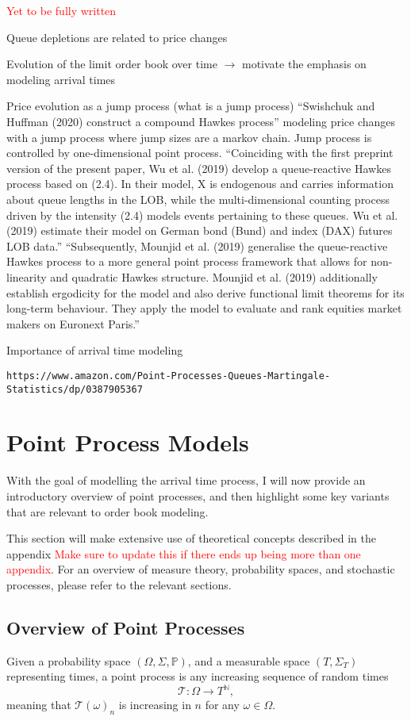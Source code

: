 \documentclass[honours,12pt]{unswthesis}
\numberwithin{equation}{section}
\begin{document}
\textcolor{red}{Yet to be fully written}

Queue depletions are related to price changes \cite{BouchaudEtAl}

Evolution of the limit order book over time $\to$ motivate the emphasis on modeling arrival times

Price evolution as a jump process (what is a jump process)
``Swishchuk and Huffman (2020) construct a compound Hawkes process'' modeling price changes with a jump process where jump sizes are a markov chain. Jump process is controlled by one-dimensional point process.
``Coinciding with the first preprint version of the present paper, Wu et al. (2019) develop a queue-reactive Hawkes process based on (2.4). In their model, X is endogenous and carries information about queue lengths in the LOB, while the multi-dimensional counting process driven by the intensity (2.4) models events pertaining to these queues. Wu et al. (2019) estimate their model on German bond (Bund) and index (DAX) futures LOB data.''
``Subsequently, Mounjid et al. (2019) generalise the queue-reactive Hawkes process to a more general point process framework that allows for non-linearity and quadratic Hawkes structure.  Mounjid et al. (2019) additionally establish ergodicity for the model and also derive functional limit theorems for its long-term behaviour. They apply the model to evaluate and rank equities market makers on Euronext Paris.''

Importance of arrival time modeling

\texttt{https://www.amazon.com/Point-Processes-Queues-Martingale-Statistics/dp/0387905367}

\chapter{Point Process Models}
With the goal of modelling the arrival time process, I will now provide an introductory overview of point processes, and then highlight some key variants that are relevant to order book modeling.

This section will make extensive use of theoretical concepts described in the appendix \textcolor{red}{Make sure to update this if there ends up being more than one appendix}. For an overview of measure theory, probability spaces, and stochastic processes, please refer to the relevant sections.

\section{Overview of Point Processes}
Given a probability space $(\Omega,\Sigma,\mathbb P)$, and a measurable space $(T,\Sigma_T)$ representing times, a point process is any increasing sequence of random times $$\mathcal T : \Omega\to T^\mathbb{N},$$
meaning that $\mathcal{T}(\omega)_n$ is increasing in $n$ for any $\omega\in\Omega$.
\end{document}
